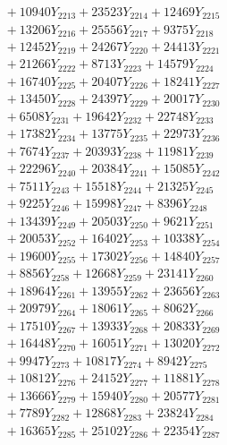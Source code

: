 \documentclass[a4paper,10pt]{article}
\begin{document}
{\begin{align}
&\;  + 10940 Y_{2213} + 23523 Y_{2214} + 12469 Y_{2215} \\[0.3ex]
&\;  + 13206 Y_{2216} + 25556 Y_{2217} + 9375 Y_{2218} \\[0.5ex]\allowbreak
&\;  + 12452 Y_{2219} + 24267 Y_{2220} + 24413 Y_{2221} \\[0.3ex]
&\;  + 21266 Y_{2222} + 8713 Y_{2223} + 14579 Y_{2224} \\[0.3ex]
&\;  + 16740 Y_{2225} + 20407 Y_{2226} + 18241 Y_{2227} \\[0.3ex]
&\;  + 13450 Y_{2228} + 24397 Y_{2229} + 20017 Y_{2230} \\[0.3ex]
&\;  + 6508 Y_{2231} + 19642 Y_{2232} + 22748 Y_{2233} \\[0.3ex]
&\;  + 17382 Y_{2234} + 13775 Y_{2235} + 22973 Y_{2236} \\[0.3ex]
&\;  + 7674 Y_{2237} + 20393 Y_{2238} + 11981 Y_{2239} \\[0.3ex]
&\;  + 22296 Y_{2240} + 20384 Y_{2241} + 15085 Y_{2242} \\[0.3ex]
&\;  + 7511 Y_{2243} + 15518 Y_{2244} + 21325 Y_{2245} \\[0.3ex]
&\;  + 9225 Y_{2246} + 15998 Y_{2247} + 8396 Y_{2248} \\[0.5ex]\allowbreak
&\;  + 13439 Y_{2249} + 20503 Y_{2250} + 9621 Y_{2251} \\[0.3ex]
&\;  + 20053 Y_{2252} + 16402 Y_{2253} + 10338 Y_{2254} \\[0.3ex]
&\;  + 19600 Y_{2255} + 17302 Y_{2256} + 14840 Y_{2257} \\[0.3ex]
&\;  + 8856 Y_{2258} + 12668 Y_{2259} + 23141 Y_{2260} \\[0.3ex]
&\;  + 18964 Y_{2261} + 13955 Y_{2262} + 23656 Y_{2263} \\[0.3ex]
&\;  + 20979 Y_{2264} + 18061 Y_{2265} + 8062 Y_{2266} \\[0.3ex]
&\;  + 17510 Y_{2267} + 13933 Y_{2268} + 20833 Y_{2269} \\[0.3ex]
&\;  + 16448 Y_{2270} + 16051 Y_{2271} + 13020 Y_{2272} \\[0.3ex]
&\;  + 9947 Y_{2273} + 10817 Y_{2274} + 8942 Y_{2275} \\[0.3ex]
&\;  + 10812 Y_{2276} + 24152 Y_{2277} + 11881 Y_{2278} \\[0.5ex]\allowbreak
&\;  + 13666 Y_{2279} + 15940 Y_{2280} + 20577 Y_{2281} \\[0.3ex]
&\;  + 7789 Y_{2282} + 12868 Y_{2283} + 23824 Y_{2284} \\[0.3ex]
&\;  + 16365 Y_{2285} + 25102 Y_{2286} + 22354 Y_{2287} \\[0.3ex]

\end{align}}
\end{document}
